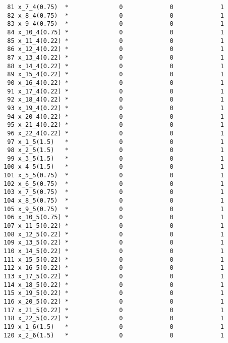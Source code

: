 \documentclass{article}[A4]
\begin{document}
\begin{verbatim}
		81 x_7_4(0.75)  *              0             0             1 
		82 x_8_4(0.75)  *              0             0             1 
		83 x_9_4(0.75)  *              0             0             1 
		84 x_10_4(0.75) *              0             0             1 
		85 x_11_4(0.22) *              0             0             1 
		86 x_12_4(0.22) *              0             0             1 
		87 x_13_4(0.22) *              0             0             1 
		88 x_14_4(0.22) *              0             0             1 
		89 x_15_4(0.22) *              0             0             1 
		90 x_16_4(0.22) *              0             0             1 
		91 x_17_4(0.22) *              0             0             1 
		92 x_18_4(0.22) *              0             0             1 
		93 x_19_4(0.22) *              0             0             1 
		94 x_20_4(0.22) *              0             0             1 
		95 x_21_4(0.22) *              0             0             1 
		96 x_22_4(0.22) *              0             0             1 
		97 x_1_5(1.5)   *              0             0             1 
		98 x_2_5(1.5)   *              0             0             1 
		99 x_3_5(1.5)   *              0             0             1 
	   100 x_4_5(1.5)   *              0             0             1 
	   101 x_5_5(0.75)  *              0             0             1 
	   102 x_6_5(0.75)  *              0             0             1 
	   103 x_7_5(0.75)  *              0             0             1 
	   104 x_8_5(0.75)  *              0             0             1 
	   105 x_9_5(0.75)  *              0             0             1 
	   106 x_10_5(0.75) *              0             0             1 
	   107 x_11_5(0.22) *              0             0             1 
	   108 x_12_5(0.22) *              0             0             1 
	   109 x_13_5(0.22) *              0             0             1 
	   110 x_14_5(0.22) *              0             0             1 
	   111 x_15_5(0.22) *              0             0             1 
	   112 x_16_5(0.22) *              0             0             1 
	   113 x_17_5(0.22) *              0             0             1 
	   114 x_18_5(0.22) *              0             0             1 
	   115 x_19_5(0.22) *              0             0             1 
	   116 x_20_5(0.22) *              0             0             1 
	   117 x_21_5(0.22) *              0             0             1 
	   118 x_22_5(0.22) *              0             0             1 
	   119 x_1_6(1.5)   *              0             0             1 
	   120 x_2_6(1.5)   *              0             0             1 

\end{verbatim}
\end{document}
